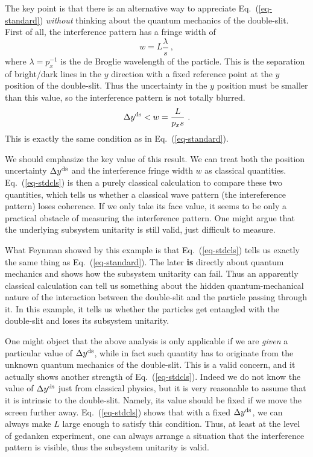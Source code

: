 \documentclass[aps,showpacs,twocolumn,floats,prd,superscriptaddress,nofootinbib]{revtex4-1}
\begin{document}
The key point is that there is an alternative way to appreciate Eq.~(\ref{eq-standard}) {\it without} thinking about the quantum mechanics of the double-slit. 
First of all, the interference pattern has a fringe width of  
\begin{equation}
w = L\frac{\lambda}{s}~,
\end{equation}
where $\lambda = p_x^{-1}$ is the de Broglie wavelength of the particle. This is the separation of bright/dark lines in the $y$ direction with a fixed reference point at the $y$ position of the double-slit. Thus the uncertainty in the $y$ position must be smaller than this value, so the interference pattern is not totally blurred.
\begin{equation}
\Delta y^{\rm ds} < w = \frac{L}{p_xs}~.
\label{eq-stdcls}
\end{equation}
This is exactly the same condition as in Eq.~(\ref{eq-standard}).

We should emphasize the key value of this result. We can treat both the position uncertainty $\Delta y^{\rm ds}$ and the interference fringe width $w$ as classical quantities. Eq.~(\ref{eq-stdcls}) is then a purely classical calculation to compare these two quantities, which tells us whether a classical wave pattern (the intereference pattern) loses coherence. If we only take its face value, it seems to be only a practical obstacle of measuring the interference pattern. One might argue that the underlying subsystem unitarity is still valid, just difficult to measure. 

What Feynman showed by this example is that Eq.~(\ref{eq-stdcls}) tells us exactly the same thing as Eq.~(\ref{eq-standard}). The later {\bf is} directly about quantum mechanics and shows how the subsystem unitarity can fail. Thus an apparently classical calculation can tell us something about the hidden quantum-mechanical nature of the interaction between the double-slit and the particle passing through it. In this example, it tells us whether the particles get entangled with the double-slit and loses its subsystem unitarity. 

One might object that the above analysis is only applicable if we are {\it given} a particular value of $\Delta y^{\rm ds}$, while in fact such quantity has to originate from the unknown quantum mechanics of the double-slit. This is a valid concern, and it actually shows another strength of Eq.~(\ref{eq-stdcls}). Indeed we do not know the value of $\Delta y^{\rm ds}$ just from classical physics, but it is very reasonable to assume that it is intrinsic to the double-slit. Namely, its value should be fixed if we move the screen further away. Eq.~(\ref{eq-stdcls}) shows that with a fixed $\Delta y^{\rm ds}$, we can always make $L$ large enough to satisfy this condition. Thus, at least at the level of gedanken experiment, one can always arrange a situation that the interference pattern is visible, thus the subsystem unitarity is valid.
\end{document}
